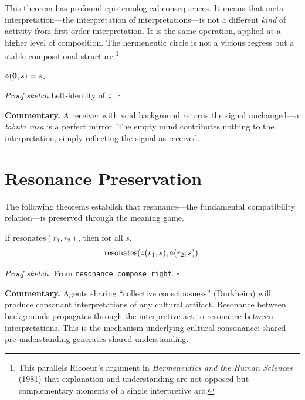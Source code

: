 This theorem has profound epistemological consequences.  It means that
meta-interpretation---the interpretation of interpretations---is not a
different \emph{kind} of activity from first-order interpretation.  It is
the same operation, applied at a higher level of composition.  The
hermeneutic circle is not a vicious regress but a stable compositional
structure.\footnote{This parallels Ricoeur's argument in \textit{Hermeneutics
and the Human Sciences} (1981) that explanation and understanding are
not opposed but complementary moments of a single interpretive arc.}

\begin{theorem}
\label{thm:void_receiver_transparent}
$\circ(\mathbf{0}, s) = s$.
\end{theorem}

\noindent\textit{Proof sketch.}\quad Left-identity of $\circ$. \hfill$\square$

\medskip

\noindent\textbf{Commentary.}
A receiver with void background returns the signal unchanged---a
\textit{tabula rasa} is a perfect mirror.  The empty mind contributes
nothing to the interpretation, simply reflecting the signal as received.

\section{Resonance Preservation}
\label{sec:ch20-resonance}

The following theorems establish that resonance---the fundamental
compatibility relation---is preserved through the meaning game.

\begin{theorem}
\label{thm:resonance_preservation}
If $\text{resonates}(r_1, r_2)$, then for all $s$,
\[
  \text{resonates}(\circ(r_1, s), \circ(r_2, s)).
\]
\end{theorem}

\noindent\textit{Proof sketch.}\quad
From \texttt{resonance\_compose\_right}.
\hfill$\square$

\medskip

\noindent\textbf{Commentary.}
Agents sharing ``collective consciousness'' (Durkheim) will produce
consonant interpretations of any cultural artifact.  Resonance between
backgrounds propagates through the interpretive act to resonance between
interpretations.  This is the mechanism underlying cultural consonance:
shared pre-understanding generates shared understanding.

